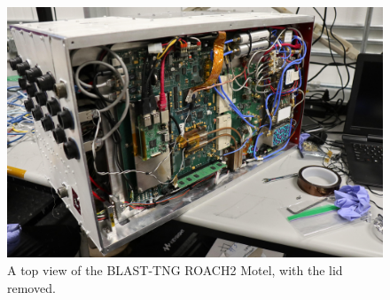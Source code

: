 \begin{figure}[!htbp]
\centering
\includegraphics[width=\textwidth]{figures/readout/hardware/roach_motel_open}
\caption[~A top view of the BLAST-TNG ROACH2 Motel, with the lid removed.]{A top view of the BLAST-TNG ROACH2 Motel, with the lid removed.}
\label{fig:top roach}
\end{figure}

